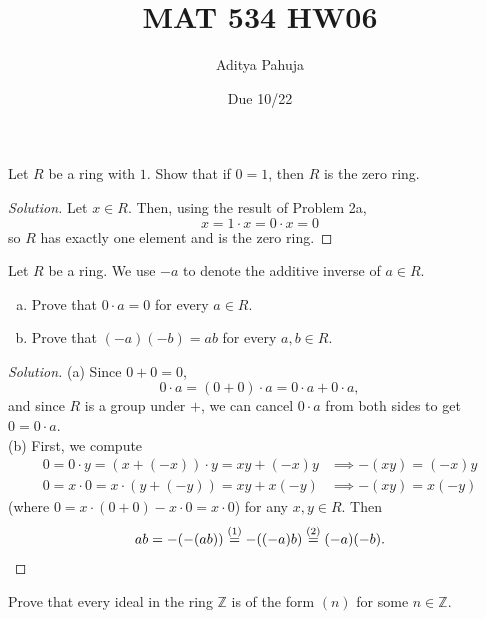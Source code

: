 \documentclass[10pt]{article}
\title{MAT 534 HW06}
\author{\large Aditya Pahuja}
\date{\large Due 10/22}
\providecommand{\ZZ}{\mathbb Z}
\providecommand{\ii}{\item}
\newenvironment{soln}{\begin{proof}[Solution]}{\end{proof}}
\begin{document}
\maketitle

\begin{problem}
    Let $R$ be a ring with $1$.
    Show that if $0=1$, then $R$ is the zero ring.
\end{problem}

\begin{soln}
    Let $x\in R$. Then, using the result of Problem 2a,
    \begin{equation*}
        x = 1\cdot x = 0\cdot x = 0
    \end{equation*}
    so $R$ has exactly one element and is the zero ring.
\end{soln}

\begin{problem}
    Let $R$ be a ring. We use $-a$ to denote the additive inverse of $a\in R$.
    \begin{enumerate}[(a)]
        \ii Prove that $0\cdot a = 0$ for every $a\in R$.
	\ii Prove that $(-a)(-b) = ab$ for every $a,b\in R$.
    \end{enumerate}
\end{problem}

\begin{soln}
    (a) Since $0 + 0 = 0$,
    \begin{equation*}
        0\cdot a = (0 + 0)\cdot a = 0\cdot a + 0\cdot a,
    \end{equation*}
    and since $R$ is a group under $+$, we can cancel $0\cdot a$ from both sides
    to get $0 = 0\cdot a$.
    \\

    (b) First, we compute
    \begin{align*}
        0 = 0\cdot y = (x + (-x))\cdot y = xy + (-x)y
	&\implies -(xy) = (-x)y
	\tag{1}\\
        0 = x\cdot 0 = x\cdot(y + (-y)) = xy + x(-y)
	&\implies -(xy) = x(-y)
	\tag{2}
    \end{align*}
    (where $0 = x\cdot (0 + 0) - x\cdot 0 = x\cdot 0$)
    for any $x,y\in R$. Then
    \begin{equation*}
	ab = -(-(ab)) \overset{(1)}= -((-a)b) \overset{(2)}= (-a)(-b).\qedhere
    \end{equation*}
\end{soln}

\begin{problem}
    Prove that every ideal in the ring $\ZZ$ is of the form $(n)$
    for some $n\in\ZZ$.
\end{problem}
\end{document}
